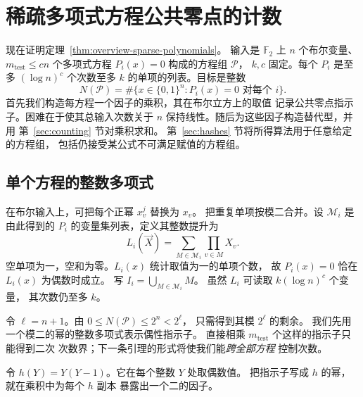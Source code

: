 \section{稀疏多项式方程公共零点的计数}\label{sec:setup}
现在证明定理~\ref{thm:overview-sparse-polynomials}。
输入是 $\mathbb F_2$ 上 $n$ 个布尔变量、$m_{\mathrm{test}}\le cn$
个多项式方程 $P_i(x)=0$ 构成的方程组 $\mathcal P$，
$k,c$ 固定。每个 $P_i$ 是至多 $(\log n)^c$ 个次数至多 $k$
的单项的列表。目标是整数
\begin{equation}\label{eq:common-zero-count}
 N(\mathcal P)=\#\{x\in\{0,1\}^n:P_i(x)=0\text{ 对每个 }i\}.
\end{equation}
首先我们构造每方程一个因子的乘积，其在布尔立方上的取值
记录公共零点指示子。困难在于使其总输入次数关于 $n$
保持线性。随后为这些因子构造替代型，并用
第~\ref{sec:counting} 节对乘积求和。
第~\ref{sec:hashes} 节将所得算法用于任意给定的方程组，
包括仍接受某公式不可满足赋值的方程组。

\subsection{单个方程的整数多项式}\label{subsec:rational-lift}
在布尔输入上，可把每个正幂 $x_v^j$ 替换为 $x_v$。
把重复单项按模二合并。设 $\mathcal M_i$ 是由此得到的
$P_i$ 的变量集列表，定义其整数提升为
\[
 L_i(\vec X)=\sum_{M\in\mathcal M_i}\prod_{v\in M}X_v .
\]
空单项为一，空和为零。$L_i(x)$ 统计取值为一的单项个数，
故 $P_i(x)=0$ 恰在 $L_i(x)$ 为偶数时成立。
写 $I_i=\bigcup_{M\in\mathcal M_i}M$。
虽然 $L_i$ 可读取 $k(\log n)^c$ 个变量，
其次数仍至多 $k$。

令 $\ell=n+1$。由 $0\le N(\mathcal P)\le2^n<2^\ell$，
只需得到其模 $2^\ell$ 的剩余。
我们先用一个模二的幂的整数多项式表示偶性指示子。
直接相乘 $m_{\mathrm{test}}$ 个这样的指示子只能得到二次
次数界；下一条引理的形式将使我们能\emph{跨全部方程}
控制次数。

令 $h(Y)=Y(Y-1)$。它在每个整数 $Y$ 处取偶数值。
把指示子写成 $h$ 的幂，就在乘积中为每个 $h$ 副本
暴露出一个二的因子。

